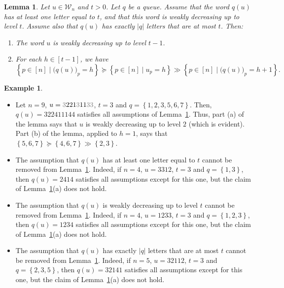 \documentclass[reqno]{amsart}
\newcommand{\0}{\phantom{c}}
\newcommand{\mcW}{\mathcal{W}}
\newcommand{\set}[1]{\left\{ #1 \right\}}
\newcommand{\abs}[1]{\left| #1 \right|}
\newcommand{\ive}[1]{\left[ #1 \right]}
\theoremstyle{plain}
\newtheorem{lemma}[thm]{Lemma}
\theoremstyle{definition}
\newtheorem{example}[thm]{Example}
\numberwithin{equation}{section}
\begin{document}
\begin{lemma}
\label{lem:determinant_form.interl-A}
Let $u \in \mcW_n$ and $t > 0$.
Let $q$ be a queue.
Assume that the word $q(u)$ has at least one letter equal to $t$, and that this word is weakly decreasing up to level $t$.
Assume also that $q(u)$ has exactly $\abs{q}$ letters that are at most $t$.
Then:

\begin{enumerate}
\item[(a)] The word $u$ is weakly decreasing up to level $t-1$.

\item[(b)] For each $h \in \ive{t-1}$, we have
\[
\set{ p \in \ive{n} \mid \bigl( q(u) \bigr)_p = h }
\succeq
\set{ p \in \ive{n} \mid u_p = h }
\gg
\set{ p \in \ive{n} \mid \bigl( q(u) \bigr)_p = h+1 } .
\]
\end{enumerate}
\end{lemma}

\begin{example}
\mbox{}
\begin{itemize}
\item Let $n = 9$, $u = {\color{gray}3}221{\color{gray}3}11{\color{gray}33}$, $t = 3$ and $q = \set{1, 2, 3, 5, 6, 7}$.
Then, $q(u) = 322411144$ satisfies all assumptions of
Lemma~\ref{lem:determinant_form.interl-A}.
Thus, part (a) of the lemma says that $u$ is weakly decreasing up to level $2$ (which is evident).
Part (b) of the lemma, applied to $h = 1$, says that
$\set{ 5, 6, 7 } \succeq \set{ 4, 6, 7 } \gg \set{ 2, 3 }$.

\item The assumption that $q(u)$ has at least one letter equal to $t$ cannot be removed from Lemma~\ref{lem:determinant_form.interl-A}.
Indeed, if $n = 4$, $u = 3312$, $t = 3$ and $q = \set{1, 3}$, then $q(u) = 2414$ satisfies all assumptions except for this one, but the claim of Lemma~\ref{lem:determinant_form.interl-A}(a) does not hold.

\item The assumption that $q(u)$ is weakly decreasing up to level $t$ cannot be removed from Lemma~\ref{lem:determinant_form.interl-A}.
Indeed, if $n = 4$, $u = 1233$, $t = 3$ and $q = \set{1, 2, 3}$, then $q(u) = 1234$ satisfies all assumptions except for this one, but the claim of Lemma~\ref{lem:determinant_form.interl-A}(a) does not hold.

\item The assumption that $q(u)$ has exactly $\abs{q}$ letters that are at most $t$ cannot be removed from Lemma~\ref{lem:determinant_form.interl-A}.
Indeed, if $n = 5$, $u = 32112$, $t = 3$ and $q = \set{2, 3, 5}$, then $q(u) = 32141$ satisfies all assumptions except for this one, but the claim of Lemma~\ref{lem:determinant_form.interl-A}(a) does not hold.
\end{itemize}
\end{example}
\end{document}
